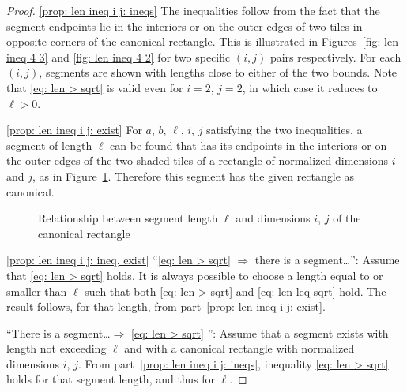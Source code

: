 \documentclass[12pt, a4paper]{article}
\newcommand{\len}{\ell} %
\begin{document}
\begin{proof}
\ref*{prop: len ineq i j: ineqs} The inequalities follow from the fact that the segment endpoints lie in the interiors or on the outer edges of two tiles in opposite corners of the canonical rectangle. This is illustrated in Figures~\ref{fig: len ineq 4 3} and \ref{fig: len ineq 4 2} for two specific $(i,j)$ pairs respectively. For each $(i,j)$, segments are shown with lengths close to either of the two bounds. Note that \eqref{eq: len > sqrt} is valid even for $i=2$, $j=2$, in which case it reduces to $\len>0$.

\ref*{prop: len ineq i j: exist} For $a$, $b$, $\len$, $i$, $j$ satisfying the two inequalities, a segment of length $\len$ can be found that has its endpoints in the interiors or on the outer edges of the two shaded tiles of a rectangle of normalized dimensions $i$ and $j$, as in Figure~\ref{fig: len ineq i j}. Therefore this segment has the given rectangle as canonical.
\begin{figure}
\centering%
\hfill%
%
\caption{Relationship between segment length $\len$ and dimensions $i$, $j$ of the canonical rectangle
}%
\label{fig: len ineq i j}
\end{figure}%

\ref*{prop: len ineq i j: ineq, exist} ``\eqref{eq: len > sqrt} $\Rightarrow$ there is a segment\ldots'': Assume that \eqref{eq: len > sqrt} holds. It is always possible to choose a length equal to or smaller than $\len$ such that both \eqref{eq: len > sqrt} and \eqref{eq: len leq sqrt} hold. The result follows, for that length, from part~\ref{prop: len ineq i j: exist}.

``There is a segment\ldots $\Rightarrow$ \eqref{eq: len > sqrt} '': Assume that a segment exists with length not exceeding $\len$ and with a canonical rectangle with normalized dimensions $i$, $j$. From part~\ref{prop: len ineq i j: ineqs}, inequality \eqref{eq: len > sqrt} holds for that segment length, and thus for $\len$.
\end{proof}
\end{document}
